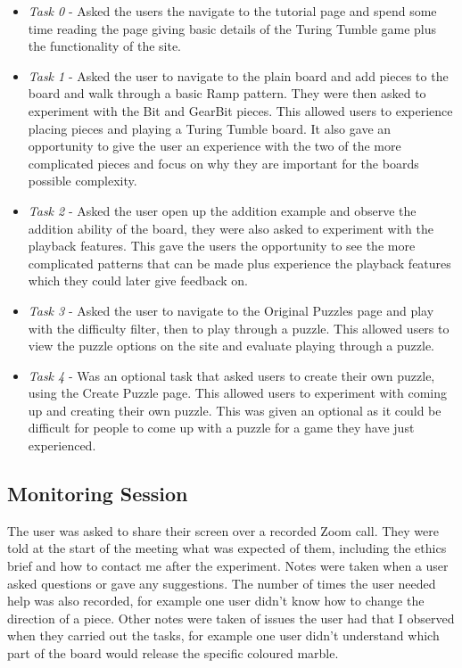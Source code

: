 \documentclass{l4proj}
\begin{document}
\begin{itemize}
    \item \emph{Task 0} - Asked the users the navigate to the tutorial page and spend some time reading the page giving basic details of the Turing Tumble game plus the functionality of the site.
    \item \emph{Task 1} - Asked the user to navigate to the plain board and add pieces to the board and walk through a basic Ramp pattern. They were then asked to experiment with the Bit and GearBit pieces. This allowed users to experience placing pieces and playing a Turing Tumble board. It also gave an opportunity to give the user an experience with the two of the more complicated pieces and focus on why they are important for the boards possible complexity.
    \item \emph{Task 2} - Asked the user open up the addition example and observe the addition ability of the board, they were also asked to experiment with the playback features. This gave the users the opportunity to see the more complicated patterns that can be made plus experience the playback features which they could later give feedback on.
    \item \emph{Task 3} - Asked the user to navigate to the Original Puzzles page and play with the difficulty filter, then to play through a puzzle. This allowed users to view the puzzle options on the site and evaluate playing through a puzzle.
    \item \emph{Task 4} - Was an optional task that asked users to create their own puzzle, using the Create Puzzle page. This allowed users to experiment with coming up and creating their own puzzle. This was given an optional as it could be difficult for people to come up with a puzzle for a game they have just experienced.
\end{itemize}

\subsection{Monitoring Session}
The user was asked to share their screen over a recorded Zoom call. They were told at the start of the meeting what was expected of them, including the ethics brief and how to contact me after the experiment. Notes were taken when a user asked questions or gave any suggestions. The number of times the user needed help was also recorded, for example one user didn't know how to change the direction of a piece. Other notes were taken of issues the user had that I observed when they carried out the tasks, for example one user didn't understand which part of the board would release the specific coloured marble.
\end{document}
